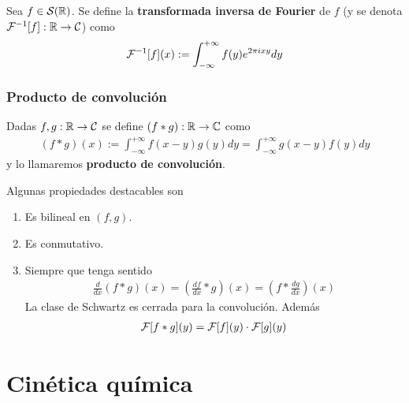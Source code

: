 \documentclass[12pt]{book}
\begin{document}
    \begin{definicion}
        Sea $f\in \mathcal{S}(\mathbb{R})$. Se define la \textbf{transformada inversa de Fourier} de $f$ (y se denota $\mathcal{F}^{-1}[f] : \mathbb{R} \to \mathcal{C}$) como 
        \begin{gather*}
            \mathcal{F}^{-1}[f](x) := \int_{-\infty}^{+\infty} f(y) e^{2\pi i xy} dy
        \end{gather*}
    \end{definicion}

    \subsubsection{Producto de convolución}
    \begin{definicion}
        Dadas $f,g: \mathbb{R}\to \mathcal{C}$ se define $(f\ast g) : \mathbb{R}\to \mathbb{C}$ como 
        \begin{gather*}
            (f\ast g)(x) := \int_{-\infty}^{+\infty} f(x-y)g(y)dy = \int_{-\infty}^{+\infty} g(x-y)f(y) dy
        \end{gather*}
        y lo llamaremos \textbf{producto de convolución}.
    \end{definicion}

    \begin{propiedades}
        Algunas propiedades destacables son 
        \begin{enumerate}
            \item Es bilineal en $(f,g)$.
            \item Es conmutativo.
            \item Siempre que tenga sentido
            \begin{gather*}
                \frac{d}{dx}(f\ast g)(x) = \left(\frac{df}{dx}\ast g\right)(x) = \left(f \ast \frac{dg}{dx}\right)(x)
            \end{gather*}
            La clase de Schwartz es cerrada para la convolución. Además 
            \begin{gather*}
                \mathcal{F}[f\ast g](y) = \mathcal{F}[f](y) \cdot \mathcal{F}[g](y)
            \end{gather*}
        \end{enumerate}
    \end{propiedades}

    \section{Cinética química}
\end{document}
